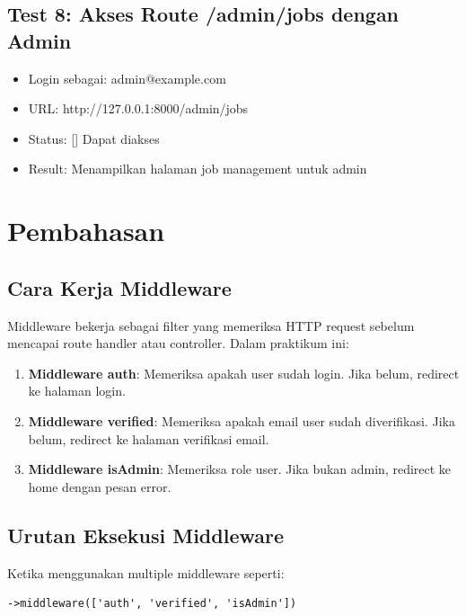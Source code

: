 \documentclass[a4paper,oneside,11pt]{book}
\begin{document}
\subsection{Test 8: Akses Route /admin/jobs dengan Admin}
\begin{itemize}
    \item Login sebagai: admin@example.com
    \item URL: http://127.0.0.1:8000/admin/jobs
    \item Status: [\checkmark] Dapat diakses
    \item Result: Menampilkan halaman job management untuk admin
\end{itemize}

\section{Pembahasan}

\subsection{Cara Kerja Middleware}

Middleware bekerja sebagai filter yang memeriksa HTTP request sebelum mencapai route handler atau controller. Dalam praktikum ini:

\begin{enumerate}
    \item \textbf{Middleware auth}: Memeriksa apakah user sudah login. Jika belum, redirect ke halaman login.
    
    \item \textbf{Middleware verified}: Memeriksa apakah email user sudah diverifikasi. Jika belum, redirect ke halaman verifikasi email.
    
    \item \textbf{Middleware isAdmin}: Memeriksa role user. Jika bukan admin, redirect ke home dengan pesan error.
\end{enumerate}

\subsection{Urutan Eksekusi Middleware}

Ketika menggunakan multiple middleware seperti:

\begin{lstlisting}[style=phpstyle]
->middleware(['auth', 'verified', 'isAdmin'])
\end{lstlisting}
\end{document}
